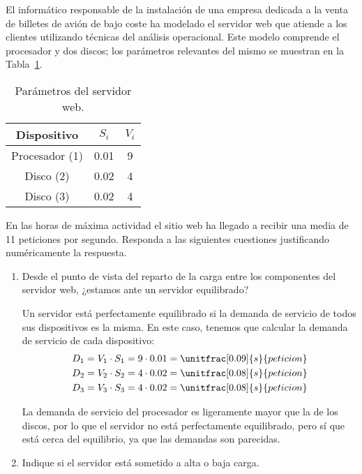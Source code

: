 \begin{ejercicio}\label{ej:5.22}
    El informático responsable de la instalación de una empresa dedicada a la venta de billetes de avión de bajo coste ha modelado el servidor web que atiende a los clientes utilizando técnicas del análisis operacional. Este modelo comprende el procesador y dos discos; los parámetros relevantes del mismo se muestran en la Tabla~\ref{tab:5.22}.
    \begin{table}[h]
        \centering
        \begin{tabular}{|c|c|c|}
            \hline
            Dispositivo & $S_i$ & $V_i$ \\
            \hline
            Procesador (1) & 0.01 & 9 \\
            Disco (2) & 0.02 & 4 \\
            Disco (3) & 0.02 & 4 \\
            \hline
        \end{tabular}
        \caption{Parámetros del servidor web.}
        \label{tab:5.22}
    \end{table}
    En las horas de máxima actividad el sitio web ha llegado a recibir una media de 11 peticiones por segundo. Responda a las siguientes cuestiones justificando numéricamente la respuesta.
    \begin{enumerate}
        \item Desde el punto de vista del reparto de la carga entre los componentes del servidor web, ¿estamos ante un servidor equilibrado?
        
        Un servidor está perfectamente equilibrado si la demanda de servicio de todos sus dispositivos es la misma. En este caso, tenemos que calcular la demanda de servicio de cada dispositivo:
        \begin{align*}
            D_1 &= V_1 \cdot S_1 = 9 \cdot 0.01 = \unitfrac[0.09]{s}{peticion} \\
            D_2 &= V_2 \cdot S_2 = 4 \cdot 0.02 = \unitfrac[0.08]{s}{peticion} \\
            D_3 &= V_3 \cdot S_3 = 4 \cdot 0.02 = \unitfrac[0.08]{s}{peticion}
        \end{align*}

        La demanda de servicio del procesador es ligeramente mayor que la de los discos, por lo que el servidor no está perfectamente equilibrado, pero sí que está cerca del equilibrio, ya que las demandas son parecidas.
        \item Indique si el servidor está sometido a alta o baja carga.
        

\end{enumerate}
\end{ejercicio}
